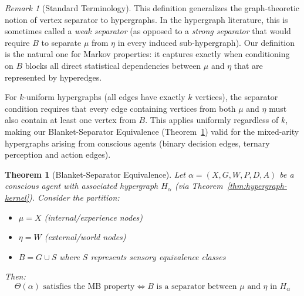 \documentclass[11pt,a4paper]{article}
\theoremstyle{definition}
\theoremstyle{plain}
\newtheorem{theorem}[definition]{Theorem}
\theoremstyle{remark}
\newtheorem{remark}[definition]{Remark}
\begin{document}
\begin{remark}[Standard Terminology]
This definition generalizes the graph-theoretic notion of vertex separator to hypergraphs. In the hypergraph literature, this is sometimes called a \emph{weak separator} (as opposed to a \emph{strong separator} that would require $B$ to separate $\mu$ from $\eta$ in every induced sub-hypergraph). Our definition is the natural one for Markov properties: it captures exactly when conditioning on $B$ blocks all direct statistical dependencies between $\mu$ and $\eta$ that are represented by hyperedges.

For $k$-uniform hypergraphs (all edges have exactly $k$ vertices), the separator condition requires that every edge containing vertices from both $\mu$ and $\eta$ must also contain at least one vertex from $B$. This applies uniformly regardless of $k$, making our Blanket-Separator Equivalence (Theorem~\ref{thm:blanket-separator}) valid for the mixed-arity hypergraphs arising from conscious agents (binary decision edges, ternary perception and action edges).
\end{remark}

\begin{theorem}[Blanket-Separator Equivalence]\label{thm:blanket-separator}
Let $\alpha = (X, G, W, P, D, A)$ be a conscious agent with associated hypergraph $H_\alpha$ (via Theorem~\ref{thm:hypergraph-kernel}). Consider the partition:
\begin{itemize}
    \item $\mu = X$ (internal/experience nodes)
    \item $\eta = W$ (external/world nodes)
    \item $B = G \cup S$ where $S$ represents sensory equivalence classes
\end{itemize}
Then:
\[
\Theta(\alpha) \text{ satisfies the MB property} \iff B \text{ is a separator between } \mu \text{ and } \eta \text{ in } H_\alpha
\]
\end{theorem}
\end{document}
